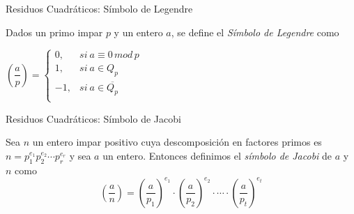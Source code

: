\documentclass{beamer}
\begin{document}


\begin{frame}{Residuos Cuadráticos: Símbolo de Legendre}
	\begin{definition}
		Dados un primo impar $p$ y un entero $a$, se define el {\em Símbolo de Legendre} como
		
		\begin{center}
			$
			\left( \dfrac{a}{p} \right) =
			\begin{cases}
			0, & si\ a \equiv 0 \, mod \, p\\
			1, & si\ a \in Q_p  \\
			-1, & si\ a \in \overline{Q_p} \\
			\end{cases}
			$
		\end{center}
	\end{definition}
\end{frame}


\begin{frame}{Residuos Cuadráticos: Símbolo de Jacobi}
	\begin{definition}
		Sea $n$ un entero impar positivo cuya descomposici\'on en factores primos es $n = p_1^{e_1} p_2^{e_2} \cdots p_r^{e_r}$ y sea $a$ un entero. Entonces definimos
		el \textit{s\'imbolo de Jacobi} de $a$ y $n$ como
		\[\left( \dfrac{a}{n} \right) = \left( \dfrac{a}{p_1} \right)^{e_1} \cdot \left( \dfrac{a}{p_2} \right)^{e_2} \cdot \cdots \cdot \left( \dfrac{a}{p_t} \right)^{e_t}\]
	\end{definition}
\end{frame}
\end{document}
